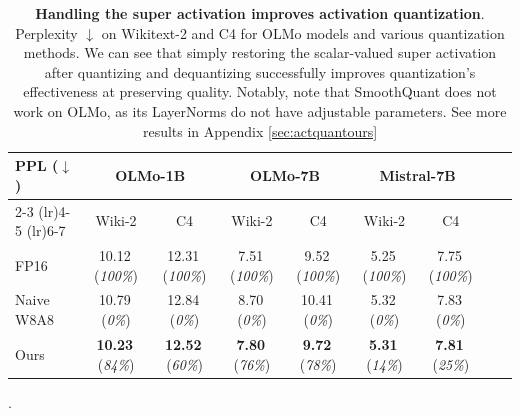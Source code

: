 \documentclass{article} %
\begin{document}
\begin{table}[t]
    \centering
    \small
    \begin{tabular}{l cccccccc}
        \toprule
        \textbf{PPL ($\downarrow$)} & \multicolumn{2}{c}{OLMo-1B} & \multicolumn{2}{c}{OLMo-7B} &  \multicolumn{2}{c}{Mistral-7B} \\
        \cmidrule(lr){2-3} \cmidrule(lr){4-5} \cmidrule(lr){6-7}
         & Wiki-2 & C4 & Wiki-2 & C4  & Wiki-2 & C4 \\
        \midrule
        FP16 & 10.12\tiny{\,(\textit{100\%})\hspace{-1pt}} & 12.31\tiny{\,(\textit{100\%})\hspace{-1pt}} & 7.51\tiny{\,(\textit{100\%})\hspace{-1pt}} & 9.52\tiny{\,(\textit{100\%})\hspace{-1pt}}  & 5.25\tiny{\,(\textit{100\%})\hspace{-1pt}} & 7.75\tiny{\,(\textit{100\%})\hspace{-1pt}} \\
        Naive W8A8 & 10.79\tiny{\,(\textit{0\%})\hspace{5pt}} & 12.84\tiny{\,(\textit{0\%})\hspace{5pt}} & 8.70\tiny{\,(\textit{0\%})\hspace{5pt}} & 10.41\tiny{\,(\textit{0\%})\hspace{5pt}}  & 5.32\tiny{\,(\textit{0\%})\hspace{5pt}} & 7.83\tiny{\,(\textit{0\%})\hspace{5pt}} \\
        Ours & \textbf{10.23}\tiny{\,(\textit{84\%})\hspace{1pt}} & \textbf{12.52}\tiny{\,(\textit{60\%})\hspace{1pt}} & \textbf{7.80}\tiny{\,(\textit{76\%})\hspace{1pt}} & \textbf{9.72}\tiny{\,(\textit{78\%})\hspace{1pt}}  & \textbf{5.31}\tiny{\,(\textit{14\%})\hspace{1pt}} & \textbf{7.81}\tiny{\,(\textit{25\%})\hspace{1pt}} \\
        \bottomrule
    \end{tabular}

    \caption{\textbf{Handling the super activation improves activation quantization}. Perplexity $\downarrow$ on Wikitext-2 and C4 for OLMo models and various quantization methods. We can see that simply restoring the scalar-valued super activation after quantizing and dequantizing successfully improves quantization's effectiveness at preserving quality. Notably, note that SmoothQuant does not work on OLMo, as its LayerNorms do not have adjustable parameters. See more results in Appendix \ref{sec:actquantours}}.
    \label{tab:act_quant_results_others}
\end{table}
\end{document}
